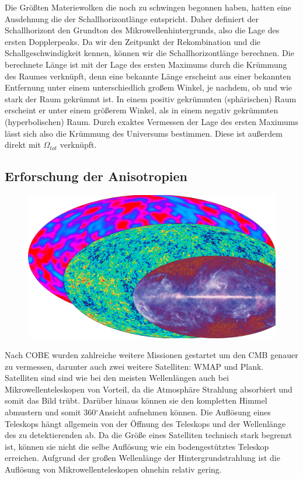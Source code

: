 \documentclass[10pt,a4paper]{article}
\newcommand{\degree}{$^\circ$}
\begin{document}
Die Größten Materiewolken die noch zu schwingen begonnen haben, hatten eine Ausdehnung die der Schallhorizontlänge entspricht. Daher definiert der Schallhorizont den Grundton des Mikrowellenhintergrunds, also die Lage des ersten Dopplerpeaks. Da wir den Zeitpunkt der Rekombination und die Schallgeschwindigkeit kennen, können wir die Schallhorizontlänge berechnen. Die berechnete Länge ist mit der Lage des ersten Maximums durch die Krümmung des Raumes verknüpft, denn eine bekannte Länge erscheint aus einer bekannten Entfernung unter einem unterschiedlich großem Winkel, je nachdem, ob und wie stark der Raum gekrümmt ist. In einem positiv gekrümmten (sphärischen) Raum erscheint er unter einem größerem Winkel, als in einem negativ gekrümmten (hyperbolischen) Raum. Durch exaktes Vermessen der Lage des ersten Maximums lässt sich also die Krümmung des Universums bestimmen. Diese ist außerdem direkt mit $\Omega_{tot}$ verknüpft.\cite{S+W03} %


\subsection{Erforschung der Anisotropien}\label{Missionen}
\begin{figure}
\center
\includegraphics[scale=0.15]{CMB}
\caption{} %
\label{cmb}
\end{figure}

Nach COBE wurden zahlreiche weitere Missionen gestartet um den CMB genauer zu vermessen, darunter auch zwei weitere Satelliten: WMAP und Plank.
Satelliten sind sind wie bei den meisten Wellenlängen auch bei Mikrowellenteleskopen von Vorteil, da die Atmosphäre Strahlung absorbiert und somit das Bild trübt. Darüber hinaus können sie den kompletten Himmel abmustern und somit 360\degree Ansicht aufnehmen können. Die Auflösung eines Teleskops hängt allgemein von der Öffnung des Teleskops und der Wellenlänge des zu detektierenden ab. Da die Größe eines Satelliten technisch stark begrenzt ist, können sie nicht die selbe Auflösung wie ein bodengestütztes Teleskop erreichen. Aufgrund der großen Wellenlänge der Hintergrundstrahlung ist die Auflösung von Mikrowellenteleskopen ohnehin relativ gering.
\end{document}
